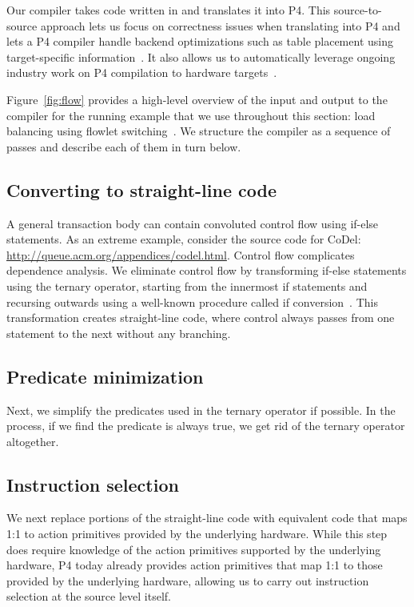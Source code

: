 Our compiler takes code written in \pktlanguage and translates it into P4. This
source-to-source approach lets us focus on correctness issues when translating
\pktlanguage into P4 and lets a P4 compiler handle backend optimizations such
as table placement using target-specific information~\cite{lavanya_compiler}.
It also allows us to automatically leverage ongoing industry work on P4
compilation to hardware targets~\cite{netronome, xilinx}.

Figure~\ref{fig:flow} provides a high-level overview of the input and output to
the compiler for the running example that we use throughout this section: load
balancing using flowlet switching~\cite{flowlets}.  We structure the compiler
as a sequence of passes and describe each of them in turn below. 


\subsection{Converting to straight-line code}
A general transaction body can contain convoluted control flow using if-else
statements. As an extreme example, consider the source code for CoDel:
\url{http://queue.acm.org/appendices/codel.html}. Control flow complicates
dependence analysis. We eliminate control flow by transforming if-else
statements using the ternary operator, starting from the innermost if
statements and recursing outwards using a well-known procedure called if
conversion~\cite{allen_if_conversion}.  This transformation creates
straight-line code, where control always passes from one statement to the next
without any branching.

\subsection{Predicate minimization}
Next, we simplify the predicates used in the ternary operator if possible.  In
the process, if we find the predicate is always true, we get rid of the ternary
operator altogether.

\subsection{Instruction selection}
We next replace portions of the straight-line code with equivalent code that
maps 1:1 to action primitives provided by the underlying hardware. While this
step does require knowledge of the action primitives supported by the
underlying hardware, P4 today already provides action primitives that map
1:1 to those provided by the underlying hardware, allowing us to carry out
instruction selection at the source level itself.

